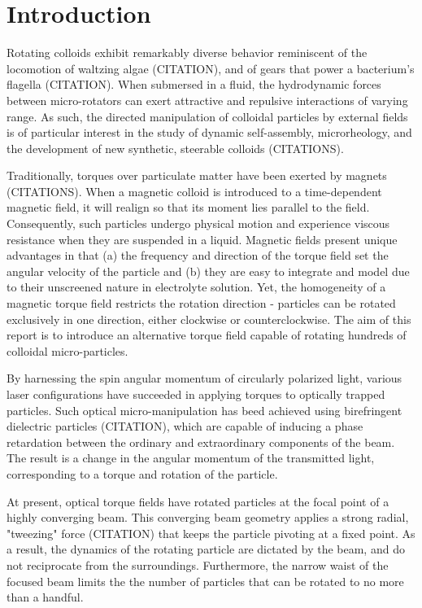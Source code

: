 \documentclass[12pt]{article}
\begin{document}
\section*{Introduction}
\hspace{15pt}Rotating colloids exhibit remarkably diverse behavior reminiscent of the locomotion of waltzing algae (CITATION), and of gears that power a bacterium’s flagella (CITATION). When submersed in a fluid, the hydrodynamic forces between micro-rotators can exert attractive and repulsive interactions of varying range. As such, the directed manipulation of colloidal particles by external fields is of particular interest in the study of dynamic self-assembly, microrheology, and the development of new synthetic, steerable colloids (CITATIONS). 

Traditionally, torques over particulate matter have been exerted by magnets (CITATIONS). When a magnetic colloid is introduced to a time-dependent magnetic field, it will realign so that its moment lies parallel to the field. Consequently, such particles undergo physical motion and experience viscous resistance when they are suspended in a liquid. Magnetic fields present unique advantages in that (a) the frequency and direction of the torque field set the angular velocity of the particle and (b) they are easy to integrate and model due to their unscreened nature in electrolyte solution. Yet, the homogeneity of a magnetic torque field restricts the rotation direction - particles can be rotated exclusively in one direction, either clockwise or counterclockwise.  The aim of this report is to introduce an alternative torque field capable of rotating hundreds of colloidal micro-particles.

By harnessing the spin angular momentum of circularly polarized light, various laser configurations have succeeded in applying torques to optically trapped particles. Such optical micro-manipulation has beed achieved using birefringent dielectric particles (CITATION), which are capable of inducing a phase retardation between the ordinary and extraordinary components of the beam. The result is a change in the angular momentum of the transmitted light, corresponding to a torque and rotation of the particle. 

At present, optical torque fields have rotated particles at the focal point of a highly converging beam. This converging beam geometry applies a strong radial, "tweezing" force (CITATION) that keeps the particle pivoting at a fixed point. As a result, the dynamics of the rotating particle are dictated by the beam, and do not reciprocate from the surroundings. Furthermore, the narrow waist of the focused beam limits the the number of particles that can be rotated to no more than a handful. 
\end{document}
